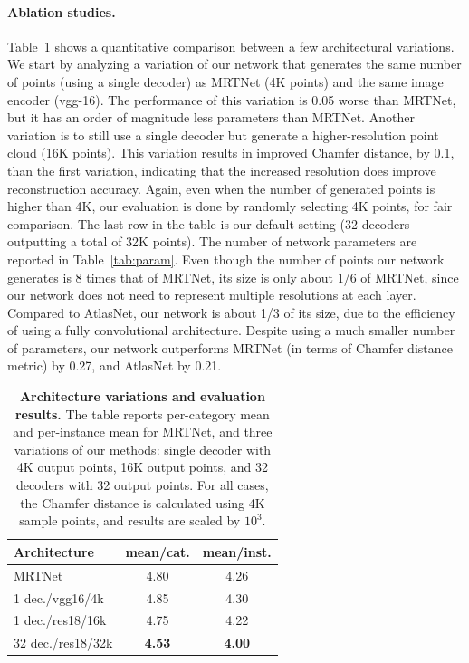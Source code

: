 \paragraph{Ablation studies.} Table~\ref{tab:alt} shows a quantitative comparison between a few architectural variations.
We start by analyzing a variation of our network that generates the same number of points (using a single decoder) as MRTNet (4K points) and the same image encoder (vgg-16).
The performance of this variation is 0.05 worse than MRTNet, but it has an order of magnitude less parameters than MRTNet.
Another variation is to still use a single decoder but generate a higher-resolution point cloud (16K points).
This variation results in improved Chamfer distance, by 0.1, than the first variation, indicating that the increased resolution does improve reconstruction accuracy. Again, even when the number of generated points is higher than 4K, our evaluation is done by randomly selecting 4K points, for fair comparison. The last row in the table is our default setting (32 decoders outputting a total of 32K points). 
The number of network parameters are reported in Table~\ref{tab:param}. Even though the number of points our network generates is 8 times that of MRTNet, its size is only about 1/6 of MRTNet, since our network does not need to represent multiple resolutions at each layer. Compared to AtlasNet, our network is about 1/3 of its size, due to the efficiency of using a fully convolutional architecture. Despite using a much smaller number of parameters, our network outperforms MRTNet (in terms of Chamfer distance metric) by 0.27, and AtlasNet by 0.21.


\begin{table}
\centering
{
\begin{tabular}{|l|c|c|}
    \hline
    Architecture &  mean/cat. & mean/inst. \\
    \hline
    MRTNet & 4.80 & 4.26 \\
    1 dec./vgg16/4k & 4.85 & 4.30\\
    1 dec./res18/16k & 4.75 & 4.22\\
    32 dec./res18/32k & \textbf{4.53} & \textbf{4.00}\\
    \hline
\end{tabular}
}
\caption{\label{tab:alt} \small
    \textbf{Architecture variations and evaluation results.} The table reports per-category mean and per-instance mean for MRTNet, and three variations of our methods: single decoder with 4K output points, 16K output points, and 32 decoders with 32 output points. For all cases, the Chamfer distance is calculated using 4K sample points, and results are scaled by $10^3$.
}
\end{table}

